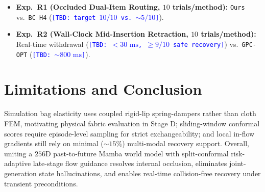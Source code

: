 \documentclass[letterpaper, 10pt, conference]{ieeeconf}
\newcommand{\tbd}[1]{\textcolor{blue}{\texttt{[TBD: #1]}}}
\begin{document}
\begin{itemize}
    \item \textbf{Exp.\ R1 (Occluded Dual-Item Routing, $10$ trials/method):} \texttt{Ours} vs.\ \texttt{BC H4} (\tbd{target $10/10$ vs.\ $\sim 5/10$}).
    \item \textbf{Exp.\ R2 (Wall-Clock Mid-Insertion Retraction, $10$ trials/method):} Real-time withdrawal (\tbd{$<30\text{ ms}$, $\ge 9/10$ safe recovery}) vs.\ \texttt{GPC-OPT} (\tbd{$\sim 800\text{ ms}$}).
\end{itemize}

\section{Limitations and Conclusion}

Simulation bag elasticity uses coupled rigid-lip spring-dampers rather than cloth FEM, motivating physical fabric evaluation in Stage D; sliding-window conformal scores require episode-level sampling for strict exchangeability; and local in-flow gradients still rely on minimal ($\sim 15\%$) multi-modal recovery support. Overall, uniting a $256\text{D}$ past-to-future Mamba world model with split-conformal risk-adaptive late-stage flow guidance resolves internal occlusion, eliminates joint-generation state hallucinations, and enables real-time collision-free recovery under transient preconditions.
\end{document}
